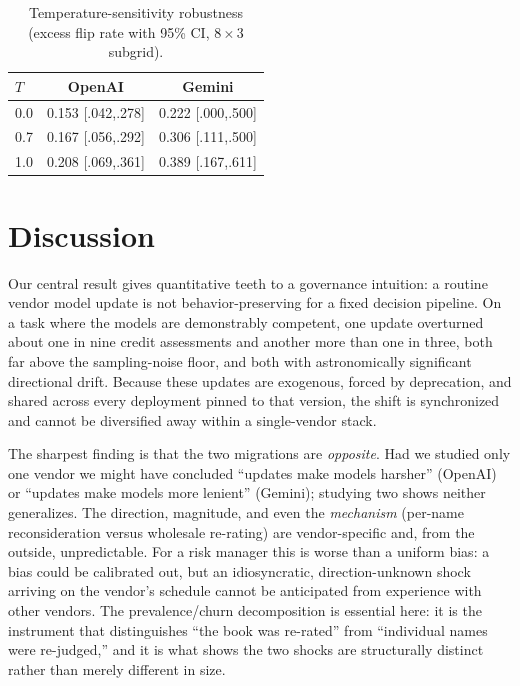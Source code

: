 \documentclass[10pt,twocolumn]{article}
\begin{document}
\begin{table}[t]
\centering
\caption{Temperature-sensitivity robustness (excess flip rate with 95\% CI, $8\times3$ subgrid).}
\label{tab:temp}
\small
\begin{tabular}{@{}lcc@{}}
\toprule
$T$ & OpenAI & Gemini \\
\midrule
0.0 & 0.153 [.042,.278] & 0.222 [.000,.500] \\
0.7 & 0.167 [.056,.292] & 0.306 [.111,.500] \\
1.0 & 0.208 [.069,.361] & 0.389 [.167,.611] \\
\bottomrule
\end{tabular}
\end{table}

\section{Discussion}
\label{sec:disc}
Our central result gives quantitative teeth to a governance intuition: a routine vendor model update is not behavior-preserving for a fixed decision pipeline. On a task where the models are demonstrably competent, one update overturned about one in nine credit assessments and another more than one in three, both far above the sampling-noise floor, and both with astronomically significant directional drift. Because these updates are exogenous, forced by deprecation, and shared across every deployment pinned to that version, the shift is synchronized and cannot be diversified away within a single-vendor stack.

The sharpest finding is that the two migrations are \emph{opposite}. Had we studied only one vendor we might have concluded ``updates make models harsher'' (OpenAI) or ``updates make models more lenient'' (Gemini); studying two shows neither generalizes. The direction, magnitude, and even the \emph{mechanism} (per-name reconsideration versus wholesale re-rating) are vendor-specific and, from the outside, unpredictable. For a risk manager this is worse than a uniform bias: a bias could be calibrated out, but an idiosyncratic, direction-unknown shock arriving on the vendor's schedule cannot be anticipated from experience with other vendors. The prevalence/churn decomposition is essential here: it is the instrument that distinguishes ``the book was re-rated'' from ``individual names were re-judged,'' and it is what shows the two shocks are structurally distinct rather than merely different in size.
\end{document}

